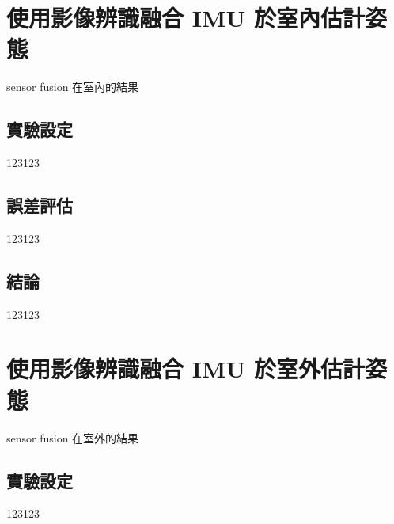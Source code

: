 
\section{使用影像辨識融合 IMU 於室內估計姿態}
sensor fusion 在室內的結果
\subsection{實驗設定}
123123
\subsection{誤差評估}
123123
\subsection{結論}
123123

\section{使用影像辨識融合 IMU 於室外估計姿態}
sensor fusion 在室外的結果
\subsection{實驗設定}
123123
